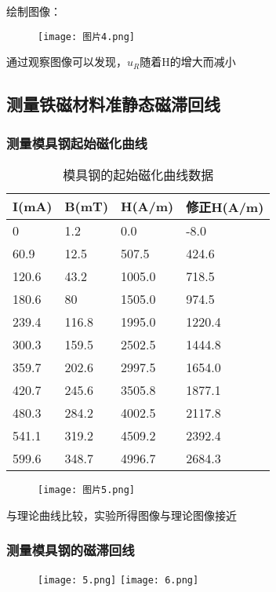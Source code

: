 \documentclass[12pt,a4paper]{article}
\begin{document}
绘制图像：
\begin{figure}[H]
    \centering
    \texttt{[image: 图片4.png]}
\end{figure}

通过观察图像可以发现，$u_R$随着H的增大而减小
\subsection{测量铁磁材料准静态磁滞回线}
\subsubsection{测量模具钢起始磁化曲线}
\begin{table}[H]
    \centering
    \caption{模具钢的起始磁化曲线数据}
    \begin{tabular}{|l|l|l|l|}
    \hline
        I(mA) & B(mT) & H(A/m) & 修正H(A/m) \\ \hline
        0 & 1.2 & 0.0  & -8.0  \\ \hline
        60.9 & 12.5 & 507.5  & 424.6  \\ \hline
        120.6 & 43.2 & 1005.0  & 718.5  \\ \hline
        180.6 & 80 & 1505.0  & 974.5  \\ \hline
        239.4 & 116.8 & 1995.0  & 1220.4  \\ \hline
        300.3 & 159.5 & 2502.5  & 1444.8  \\ \hline
        359.7 & 202.6 & 2997.5  & 1654.0  \\ \hline
        420.7 & 245.6 & 3505.8  & 1877.1  \\ \hline
        480.3 & 284.2 & 4002.5  & 2117.8  \\ \hline
        541.1 & 319.2 & 4509.2  & 2392.4  \\ \hline
        599.6 & 348.7 & 4996.7  & 2684.3 \\ \hline
    \end{tabular}
\end{table}

\begin{figure}[H]
    \centering
    \texttt{[image: 图片5.png]}
\end{figure}

与理论曲线比较，实验所得图像与理论图像接近

\subsubsection{测量模具钢的磁滞回线}
\begin{figure}[H]
    \centering
    \texttt{[image: 5.png]}
    \texttt{[image: 6.png]}
\end{figure}
\end{document}
